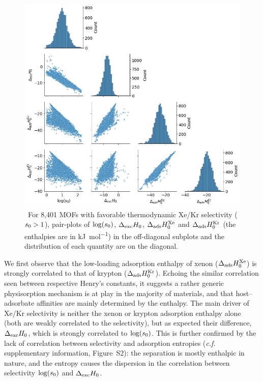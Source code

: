 \documentclass[main]{subfiles}
\begin{document}
\begin{figure}[t]
\centering
  \includegraphics[width=\linewidth]{figures/2-thermo/Enthalpy_0_log.jpg}
  \caption{\ For 8,401 MOFs with favorable thermodynamic Xe/Kr selectivity ($s_{\text{0}} > 1$), pair-plots of $\log(s_{\text{0}})$, $\Delta_{\text{exc}}H_{\text{0}}$, $\Delta_{\text{ads}}H^{\text{Xe}}_{\text{0}}$ and $\Delta_{\text{ads}}H^{\text{Kr}}_{\text{0}}$ (the enthalpies are in \si{\kilo\joule\per\mol}) in the off-diagonal subplots and the distribution of each quantity are on the diagonal.}
  \label{fgr:histo_H}
\end{figure}

We first observe that the low-loading adsorption enthalpy of xenon ($\Delta_{\text{ads}}H^{\text{Xe}}_{\text{0}}$) is strongly correlated to that of krypton ($\Delta_{\text{ads}}H^{\text{Kr}}_{\text{0}}$). Echoing the similar correlation seen between respective Henry's constants, it suggests a rather generic physisorption mechanism is at play in the majority of materials, and that host--adsorbate affinities are mainly determined by the enthalpy. The main driver of Xe/Kr selectivity is neither the xenon or krypton adsorption enthalpy alone (both are weakly correlated to the selectivity), but as expected their difference, $\Delta_{\text{exc}}H_{\text{0}}$, which is strongly correlated to $\log(s_{\text{0}})$. This is further confirmed by the lack of correlation between selectivity and adsorption entropies (\emph{c.f.} supplementary information, Figure~S2): the separation is mostly enthalpic in nature, and the entropy causes the dispersion in the correlation between selectivity $\log(s_{\text{0}})$ and $\Delta_{\text{exc}}H_{\text{0}}$.
\end{document}
